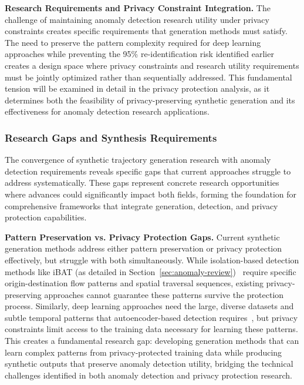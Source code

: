 \documentclass[runningheads]{llncs}
\begin{document}
\textbf{Research Requirements and Privacy Constraint Integration.} The challenge of maintaining anomaly detection research utility under privacy constraints creates specific requirements that generation methods must satisfy. The need to preserve the pattern complexity required for deep learning approaches while preventing the 95\% re-identification risk identified earlier creates a design space where privacy constraints and research utility requirements must be jointly optimized rather than sequentially addressed. This fundamental tension will be examined in detail in the privacy protection analysis, as it determines both the feasibility of privacy-preserving synthetic generation and its effectiveness for anomaly detection research applications.

\subsubsection{Research Gaps and Synthesis Requirements}

The convergence of synthetic trajectory generation research with anomaly detection requirements reveals specific gaps that current approaches struggle to address systematically. These gaps represent concrete research opportunities where advances could significantly impact both fields, forming the foundation for comprehensive frameworks that integrate generation, detection, and privacy protection capabilities.

\textbf{Pattern Preservation vs. Privacy Protection Gaps.} Current synthetic generation methods address either pattern preservation or privacy protection effectively, but struggle with both simultaneously. While isolation-based detection methods like iBAT (as detailed in Section~\ref{sec:anomaly-review})~\cite{zhang2019ibat} require specific origin-destination flow patterns and spatial traversal sequences, existing privacy-preserving approaches cannot guarantee these patterns survive the protection process. Similarly, deep learning approaches need the large, diverse datasets and subtle temporal patterns that autoencoder-based detection requires~\cite{huang2021lstm}, but privacy constraints limit access to the training data necessary for learning these patterns. This creates a fundamental research gap: developing generation methods that can learn complex patterns from privacy-protected training data while producing synthetic outputs that preserve anomaly detection utility, bridging the technical challenges identified in both anomaly detection and privacy protection research.
\end{document}
